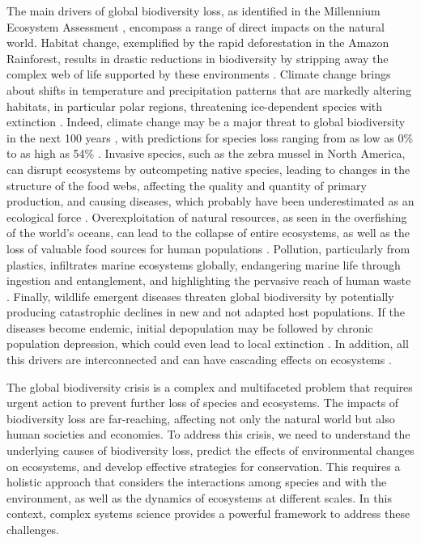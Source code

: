 The main drivers of global biodiversity loss, as identified in the Millennium
Ecosystem Assessment \cite{finlayson2005millennium}, encompass a range of
direct impacts on the natural world. Habitat change, exemplified by the rapid
deforestation in the Amazon Rainforest, results in drastic reductions in
biodiversity by stripping away the complex web of life supported by these
environments \cite{Laurance2012}. Climate change brings about shifts in
temperature and precipitation patterns that are markedly altering habitats, in
particular polar regions, threatening ice-dependent species with extinction
\cite{Post2013}. Indeed, climate change may be a major threat to global
biodiversity in the next 100 years
\cite{Thomas2004,Loarie2009,Pimm2009,Warren2013,Warren2018}, with
predictions for species loss ranging from as low as 0\% to as high as 54\%
\cite{Urban2015}. Invasive species, such as the zebra mussel in North America,
can disrupt ecosystems by outcompeting native species, leading to changes in
the structure of the food webs, affecting the quality and quantity of primary
production, and causing diseases, which probably have been underestimated as an
ecological force \cite{Strayer2010}. Overexploitation of natural
resources, as seen in the overfishing of the world's oceans, can lead to the
collapse of entire ecosystems, as well as the loss of valuable food sources for
human populations \cite{Dayton1995,Coleman2002}. Pollution, particularly from
plastics, infiltrates marine ecosystems globally, endangering marine life
through ingestion and entanglement, and highlighting the pervasive reach of
human waste \cite{Rochman2015}. Finally, wildlife emergent diseases threaten
global biodiversity by potentially producing catastrophic declines in new and
not adapted host populations. If the diseases become endemic, initial
depopulation may be followed by chronic population depression, which could even
lead to local extinction \cite{Daszak2000}. In addition, all this drivers are
interconnected and can have cascading effects on ecosystems \cite{Mora2007}.

The global biodiversity crisis is a complex and multifaceted problem that
requires urgent action to prevent further loss of species and ecosystems. The
impacts of biodiversity loss are far-reaching, affecting not only the natural
world but also human societies and economies. To address this crisis, we need
to understand the underlying causes of biodiversity loss, predict the effects
of environmental changes on ecosystems, and develop effective strategies for
conservation. This requires a holistic approach that considers the interactions
among species and with the environment, as well as the dynamics of ecosystems
at different scales. In this context, complex systems science provides a
powerful framework to address these challenges.

